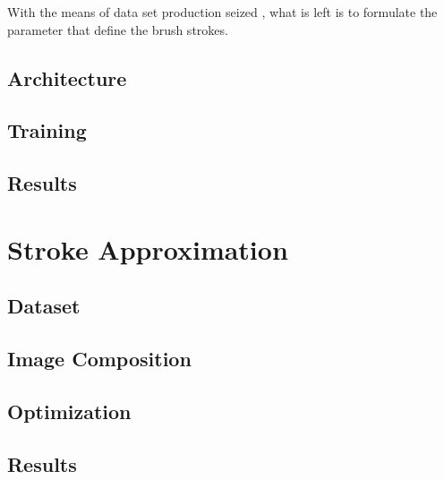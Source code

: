 With the means of data set production seized , what is left
is to formulate the parameter that define the brush strokes.


\subsection{Architecture}

\subsection{Training}

\subsection{Results}

\section{Stroke Approximation}

\subsection{Dataset}

\subsection{Image Composition}

\subsection{Optimization}

\subsection{Results}

